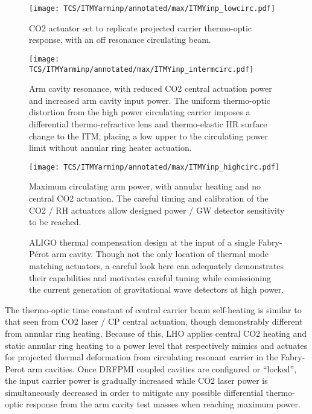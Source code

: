 \begin{figure}[H]
	\begin{subcaptiongroup}
		\centering
		\texttt{[image: TCS/ITMYarminp/annotated/max/ITMYinp\_lowcirc.pdf]}
		\caption{CO2 actuator set to replicate projected carrier thermo-optic response, with an off resonance circulating beam.}\label{subfig:TCSinp_lowcirc}
		\texttt{[image: TCS/ITMYarminp/annotated/max/ITMYinp\_intermcirc.pdf]}
		\caption{Arm cavity resonance, with reduced CO2 central actuation power and increased arm cavity input power. The uniform thermo-optic distortion from the high power circulating carrier imposes a differential thermo-refractive lens and thermo-elastic HR surface change to the ITM, placing a low upper to the circulating power limit without annular ring heater actuation.}\label{subfig:TCSinp_intcirc}
		\texttt{[image: TCS/ITMYarminp/annotated/max/ITMYinp\_highcirc.pdf]}
		\caption{Maximum circulating arm power, with annular heating and no central CO2 actuation. The careful timing and calibration of the CO2 / RH actuators allow designed power / GW detector sensitivity to be reached.}\label{subfig:TCSinp_highcirc}
	\end{subcaptiongroup}
	\caption{ALIGO thermal compensation design at the input of a single Fabry-P\'{e}rot arm cavity. Though not the only location of thermal mode matching actuators, a careful look here can adequately demonstrates their capabilities and motivates careful tuning while comissioning the current generation of gravitational wave detectors at high power.}
	\label{fig:TCSinp}
\end{figure}

The thermo-optic time constant of central carrier beam self-heating is similar to that seen from CO2 laser / CP central actuation, though demonstrably different from annular ring heating. Because of this, LHO applies central CO2 heating and static annular ring heating to a power level that respectively mimics and actuates for projected thermal deformation from circulating resonant carrier in the Fabry-Perot arm cavities. Once DRFPMI coupled cavities are configured or ``locked'', the input carrier power is gradually increased while CO2 laser power is simultaneously decreased in order to mitigate any possible differential thermo-optic response from the arm cavity test masses when reaching maximum power.

